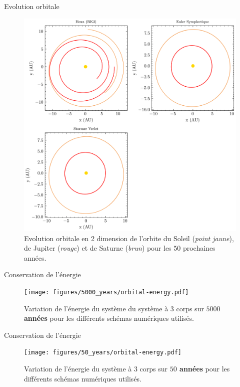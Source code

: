 \documentclass[10pt]{beamer}
\begin{document}
\begin{frame}{Evolution orbitale}
  \begin{figure}
    \centering
    \includegraphics[width=\textwidth,height=0.7\textheight,keepaspectratio]{figures/50_years/orbital-plot2d.png}
    \caption{Evolution orbitale en 2 dimension de l'orbite du Soleil (\emph{point jaune}), de Jupiter (\emph{rouge}) et de Saturne (\emph{brun}) pour les $50$ prochaines années.}
    \label{fig:plot2D--50}
  \end{figure}
\end{frame}

\begin{frame}{Conservation de l'énergie}
  \begin{figure}
    \centering
    \texttt{[image: figures/5000\_years/orbital-energy.pdf]}
    \caption{Variation de l'énergie du système du système à 3 corps sur \textbf{$5000$ années} pour les différents schémas numériques utilisés.}
    \label{fig:orbital-energy--5000}
  \end{figure}
\end{frame}

\begin{frame}{Conservation de l'énergie}
  \begin{figure}
    \centering
    \texttt{[image: figures/50\_years/orbital-energy.pdf]}
    \caption{Variation de l'énergie du système à 3 corps sur \textbf{$50$ années} pour les différents schémas numériques utilisés.}
    \label{fig:orbital-energy--50}
  \end{figure}
\end{frame}
\end{document}
